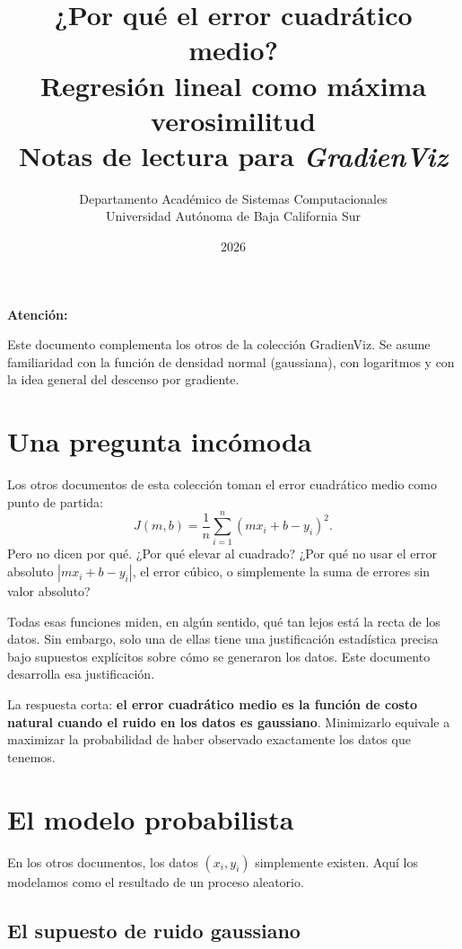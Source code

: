 \documentclass[12pt, a4paper]{article}
\title{
    {\Large\bfseries ¿Por qué el error cuadrático medio?}\\[0.4em]
    {\large Regresión lineal como máxima verosimilitud}\\[0.8em]
    {\normalsize Notas de lectura para \textit{GradienViz}}
}
\author{
    Departamento Académico de Sistemas Computacionales\\
    Universidad Autónoma de Baja California Sur
}
\date{2026}
\newenvironment{vizadv}{%
    \begin{mdframed}[style=viznaranja]
    \textbf{\color{bordeadv}Atención:}\quad
}{%
    \end{mdframed}
}
\begin{document}
\maketitle
\tableofcontents
\vspace{1em}

\begin{vizadv}
Este documento complementa los otros de la colección GradienViz.
Se asume familiaridad con la función de densidad normal (gaussiana),
con logaritmos y con la idea general del descenso por gradiente.
\end{vizadv}

\section{Una pregunta incómoda}

Los otros documentos de esta colección toman el error cuadrático medio
como punto de partida:
\[
    J(m, b) = \frac{1}{n}\sum_{i=1}^{n}(m x_i + b - y_i)^2.
\]
Pero no dicen por qué. ¿Por qué elevar al cuadrado?
¿Por qué no usar el error absoluto $|m x_i + b - y_i|$,
el error cúbico, o simplemente la suma de errores sin valor absoluto?

Todas esas funciones miden, en algún sentido, qué tan lejos está la
recta de los datos. Sin embargo, solo una de ellas tiene una justificación
estadística precisa bajo supuestos explícitos sobre cómo se generaron
los datos. Este documento desarrolla esa justificación.

La respuesta corta: \textbf{el error cuadrático medio es la función
de costo natural cuando el ruido en los datos es gaussiano}.
Minimizarlo equivale a maximizar la probabilidad de haber observado
exactamente los datos que tenemos.

\section{El modelo probabilista}

En los otros documentos, los datos $(x_i, y_i)$ simplemente existen.
Aquí los modelamos como el resultado de un proceso aleatorio.

\subsection{El supuesto de ruido gaussiano}
\end{document}

